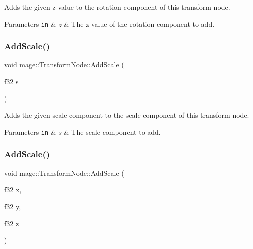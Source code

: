 Adds the given z-\/value to the rotation component of this transform node.


\begin{DoxyParams}[1]{Parameters}
\mbox{\tt in}  & {\em z} & The z-\/value of the rotation component to add. \\
\hline
\end{DoxyParams}
\hypertarget{structmage_1_1_transform_node_a2ec8f54f469fc0aa4f11ad8d949f33be}{}\label{structmage_1_1_transform_node_a2ec8f54f469fc0aa4f11ad8d949f33be} 
\subsubsection{\texorpdfstring{Add\+Scale()}{AddScale()}\hspace{0.1cm}{\footnotesize\ttfamily [1/4]}}
{\footnotesize\ttfamily void mage\+::\+Transform\+Node\+::\+Add\+Scale (\begin{DoxyParamCaption}\item[{\hyperlink{namespacemage_a6a44ad388483959dc4dff9f2aef91431}{f32}}]{s }\end{DoxyParamCaption})\hspace{0.3cm}{\ttfamily [noexcept]}}

Adds the given scale component to the scale component of this transform node.


\begin{DoxyParams}[1]{Parameters}
\mbox{\tt in}  & {\em s} & The scale component to add. \\
\hline
\end{DoxyParams}
\hypertarget{structmage_1_1_transform_node_acaa3555428eb9a95e2d1227331aa39e9}{}\label{structmage_1_1_transform_node_acaa3555428eb9a95e2d1227331aa39e9} 
\subsubsection{\texorpdfstring{Add\+Scale()}{AddScale()}\hspace{0.1cm}{\footnotesize\ttfamily [2/4]}}
{\footnotesize\ttfamily void mage\+::\+Transform\+Node\+::\+Add\+Scale (\begin{DoxyParamCaption}\item[{\hyperlink{namespacemage_a6a44ad388483959dc4dff9f2aef91431}{f32}}]{x,  }\item[{\hyperlink{namespacemage_a6a44ad388483959dc4dff9f2aef91431}{f32}}]{y,  }\item[{\hyperlink{namespacemage_a6a44ad388483959dc4dff9f2aef91431}{f32}}]{z }\end{DoxyParamCaption})\hspace{0.3cm}{\ttfamily [noexcept]}}

